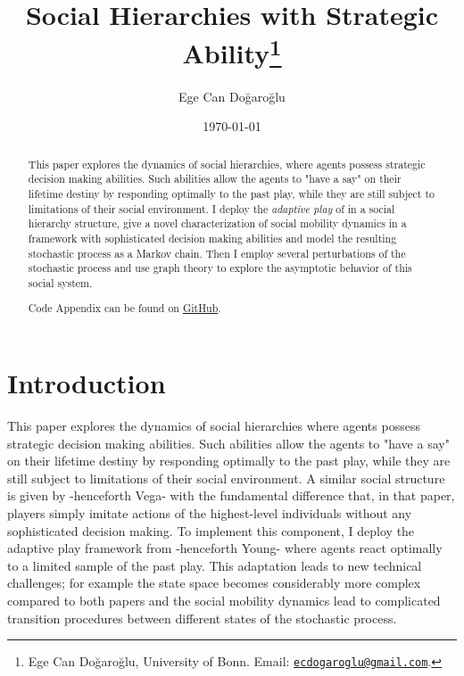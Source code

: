 \documentclass[11pt, a4paper, leqno]{article}
\begin{document}
\title{Social Hierarchies with Strategic Ability\thanks{Ege Can Doğaroğlu, University of Bonn. Email: \href{mailto:ecdogaroglu@gmail.com}{\nolinkurl{ecdogaroglu@gmail.com}}.}}

\author{Ege Can Doğaroğlu}

\date{
    \today
}

\maketitle


\begin{abstract}
    This paper explores the dynamics of social hierarchies, where agents possess strategic decision making abilities. Such abilities allow the agents to "have a say" on their lifetime destiny by responding optimally to the past play, while they are still subject to limitations of their social environment.
    I deploy the \textit{adaptive play} of  in a social hierarchy
    structure, give a novel characterization of social mobility dynamics in a framework with sophisticated
    decision making abilities and model the resulting stochastic process as a Markov chain.
    Then I employ several perturbations of the stochastic process and use graph theory to explore 
    the asymptotic behavior of this social system.

    Code Appendix can be found on \href{https://github.com/ecdogaroglu/social-hierarchies}{GitHub}.
    
\end{abstract}

\clearpage



\section*{Introduction}
This paper explores the dynamics of social hierarchies where agents possess strategic decision making abilities. Such abilities allow the agents to "have a say" on their lifetime destiny by responding optimally to the past play, while they are still subject to limitations of their social environment. A similar social structure is given by \citet{vega2000unfolding} -henceforth Vega- with the fundamental difference that, in that paper, players simply imitate actions of the highest-level individuals without any sophisticated decision making. To implement this component, I deploy the adaptive play framework from \citet{young1993evolution} -henceforth Young- where agents react optimally to a limited sample of the past play. This adaptation leads to new technical challenges; for example the state space becomes considerably more complex compared to both papers and the social mobility dynamics lead to complicated transition procedures between different states of the stochastic process.
\end{document}
